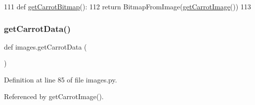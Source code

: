 \begin{DoxyCode}
111 \textcolor{keyword}{def }\hyperlink{namespaceimages_a1f0f3db4c047cc2a3a3f1de039b9cbd2}{getCarrotBitmap}():
112     \textcolor{keywordflow}{return} BitmapFromImage(\hyperlink{namespaceimages_ac43eb979d7c688296c5da9ff3d0ae5bc}{getCarrotImage}())
113 
\end{DoxyCode}
\mbox{\label{namespaceimages_a0c5ea40e98df45c2f313e28639a2b321}} 
\subsubsection{\texorpdfstring{get\+Carrot\+Data()}{getCarrotData()}}
{\footnotesize\ttfamily def images.\+get\+Carrot\+Data (\begin{DoxyParamCaption}{ }\end{DoxyParamCaption})}



Definition at line 85 of file images.\+py.



Referenced by get\+Carrot\+Image().


